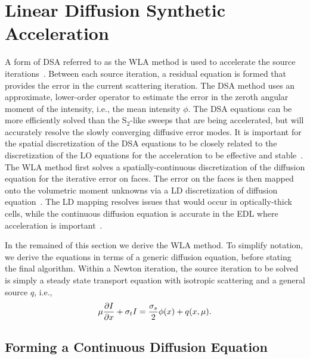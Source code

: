 \section{Linear Diffusion Synthetic Acceleration}

A form of DSA referred to as the WLA method is used to accelerate the source
iterations~\cite{wla,wla_thesis}. 
Between each source iteration, a residual equation is formed that provides 
the error in the current scattering iteration. The DSA method uses an approximate,
lower-order operator to estimate the error in the zeroth angular moment of the
intensity, i.e., the mean intensity $\phi$.  The DSA equations can be more efficiently
solved than the S$_2$-like sweeps that are being accelerated, but will accurately resolve the
slowly converging diffusive error modes.  It is important for the spatial discretization of the DSA
equations to be closely related to the discretization of the LO equations for the
acceleration to be effective and stable~\cite{adams_dsa}.  The WLA method first solves a spatially-continuous
discretization of the diffusion equation
for the iterative error on faces.  The error on the faces is then mapped onto the
volumetric moment unknowns via a LD discretization of diffusion equation~\cite{wla}.
The LD mapping resolves issues that would occur in optically-thick cells, while the
continuous diffusion equation is accurate in the EDL where acceleration is important~\cite{adams_dsa}.

In the remained of this section we derive the WLA method.  To simplify notation, we
derive the equations in terms of a generic diffusion equation, before stating the final
algorithm. Within a
Newton iteration, the source iteration to be solved is simply a steady state
transport equation with isotropic scattering and a general source $q$, i.e.,
\begin{equation}\label{eq:ss_trans}
    \mu \frac{\partial I}{\partial x} + \sigma_t I = \frac{\sigma_s}{2} \phi(x) + q(x,\mu).
\end{equation}

\subsection{Forming a Continuous Diffusion Equation}

